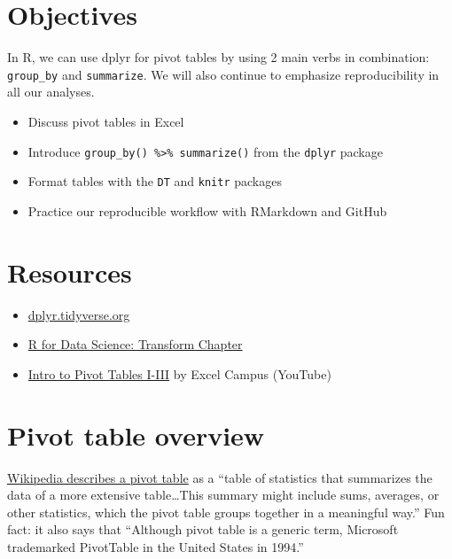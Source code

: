 \documentclass[]{book}
\providecommand{\tightlist}{%
  \setlength{\itemsep}{0pt}\setlength{\parskip}{0pt}}
\begin{document}
\hypertarget{objectives-4}{%
\section{Objectives}\label{objectives-4}}

In R, we can use dplyr for pivot tables by using 2 main verbs in combination: \texttt{group\_by} and \texttt{summarize}. We will also continue to emphasize reproducibility in all our analyses.

\begin{itemize}
\tightlist
\item
  Discuss pivot tables in Excel
\item
  Introduce \texttt{group\_by()\ \%\textgreater{}\%\ summarize()} from the \texttt{dplyr} package
\item
  Format tables with the \texttt{DT} and \texttt{knitr} packages
\item
  Practice our reproducible workflow with RMarkdown and GitHub
\end{itemize}

\hypertarget{resources-5}{%
\section{Resources}\label{resources-5}}

\begin{itemize}
\tightlist
\item
  \href{https://dplyr.tidyverse.org/}{dplyr.tidyverse.org}
\item
  \href{https://r4ds.had.co.nz/transform.html}{R for Data Science: Transform Chapter}
\item
  \href{https://youtu.be/g530cnFfk8Y}{Intro to Pivot Tables I-III} by Excel Campus (YouTube)
\end{itemize}

\hypertarget{pivot-table-overview}{%
\section{Pivot table overview}\label{pivot-table-overview}}

\href{https://en.wikipedia.org/wiki/Pivot_table}{Wikipedia describes a pivot table} as a ``table of statistics that summarizes the data of a more extensive table\ldots{}This summary might include sums, averages, or other statistics, which the pivot table groups together in a meaningful way.'' Fun fact: it also says that ``Although pivot table is a generic term, Microsoft trademarked PivotTable in the United States in 1994.''
\end{document}
